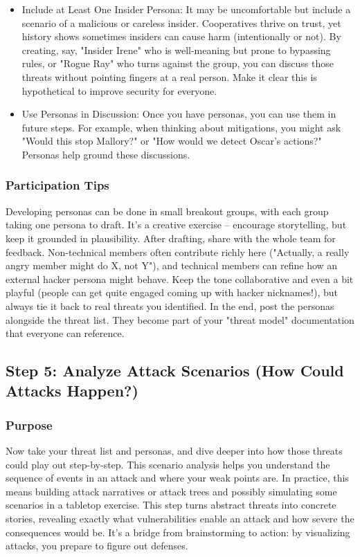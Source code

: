 \begin{itemize}
    \item Include at Least One Insider Persona: It may be uncomfortable but include a scenario of a malicious or
    careless insider. Cooperatives thrive on trust, yet history shows sometimes insiders can cause harm (intentionally
    or not). By creating, say, "Insider Irene" who is well-meaning but prone to bypassing rules, or "Rogue Ray" who
    turns against the group, you can discuss those threats without pointing fingers at a real person. Make it clear
    this is hypothetical to improve security for everyone.
    
    \item Use Personas in Discussion: Once you have personas, you can use them in future steps. For example, when
    thinking about mitigations, you might ask "Would this stop Mallory?" or "How would we detect Oscar's actions?"
    Personas help ground these discussions.
\end{itemize}

\subsubsection{Participation Tips}

Developing personas can be done in small breakout groups, with each group taking
one persona to draft. It's a creative exercise – encourage storytelling, but
keep it grounded in plausibility. After drafting, share with the whole team for
feedback. Non-technical members often contribute richly here ("Actually, a
really angry member might do X, not Y"), and technical members can refine how an
external hacker persona might behave. Keep the tone collaborative and even a bit
playful (people can get quite engaged coming up with hacker nicknames!), but
always tie it back to real threats you identified. In the end, post the personas
alongside the threat list. They become part of your "threat model" documentation
that everyone can reference.

\subsection{Step 5: Analyze Attack Scenarios (How Could Attacks Happen?)}
\label{subsec:Step5}

\subsubsection{Purpose}

Now take your threat list and personas, and dive deeper into how those threats
could play out step-by-step. This scenario analysis helps you understand the
sequence of events in an attack and where your weak points are. In practice,
this means building attack narratives or attack trees and possibly simulating
some scenarios in a tabletop exercise. This step turns abstract threats into
concrete stories, revealing exactly what vulnerabilities enable an attack and
how severe the consequences would be. It's a bridge from brainstorming to
action: by visualizing attacks, you prepare to figure out defenses.

